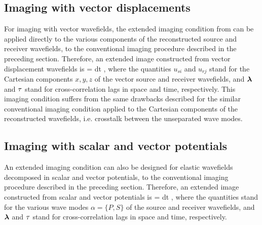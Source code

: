 \subsection{Imaging with vector displacements}

For  imaging with vector wavefields, the extended
imaging condition from  can be applied directly to the various
components of the reconstructed source and receiver wavefields,
  to the conventional imaging procedure
described in the preceding section. Therefore, an extended image
constructed from vector displacement wavefields is
%
\beq \label{eqn:XICa}
\ofxlt = \int {}\ofxlm {}\ofxlp dt \;,
\eeq
%
where the quantities $u_{si}$ and $u_{rj}$ stand for the Cartesian
components ${x,y,z}$ of the vector source and receiver wavefields, and
$\hh$ and $\tt$ stand for cross-correlation lags in space and time,
respectively. This imaging condition suffers from the same drawbacks
described for the similar conventional imaging condition applied to
the Cartesian components of the reconstructed wavefields,
i.e. crosstalk between the unseparated wave modes.

\subsection{Imaging with scalar and vector potentials}

An extended imaging condition can also be designed for elastic
wavefields decomposed in scalar and vector potentials, 
 to the conventional imaging procedure described in the
preceding section. Therefore, an extended image constructed from
scalar and vector potentials is
%
\beq \label{eqn:XICe}
\ofxlt = \int {}\ofxlm {}\ofxlp dt \;,
\eeq
%
where the quantities 
 stand for the various wave
modes $\alpha=\{P, S\}$ of the source and receiver wavefields, and
$\hh$ and $\tt$ stand for cross-correlation lags in space and time,
respectively.  
